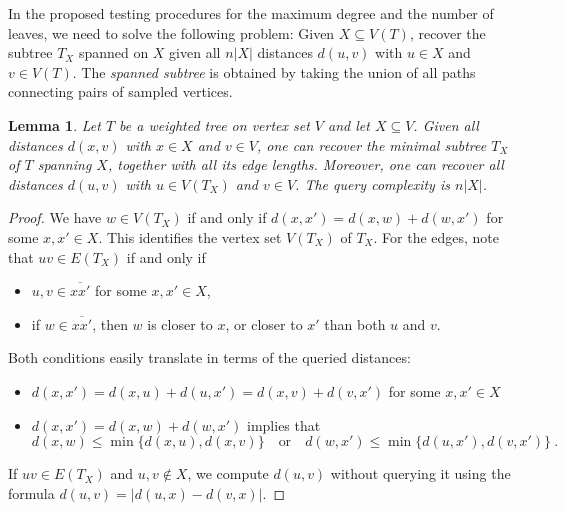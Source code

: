 \documentclass[12pt]{article}
\newtheorem{lemma}[theorem]{Lemma}
\begin{document}
In the proposed testing procedures for the maximum degree and the number of leaves, we need to solve the following problem: Given $X\subseteq V(T)$, recover the subtree $T_X$ spanned on $X$ given all $n|X|$ distances $d(u,v)$ with $u\in X$ and $v\in V(T)$. The \emph{spanned subtree} is obtained by taking the union of all
paths connecting pairs of sampled vertices.
\begin{lemma}\label{lem:TX}
Let $T$ be a weighted tree on vertex set $V$ and let $X\subseteq V$. Given all distances $d(x,v)$ with $x\in X$ and $v\in V$, one can recover the minimal subtree $T_X$ of $T$ spanning $X$, together with all its edge lengths. Moreover, one can recover all distances $d(u,v)$ with $u\in V(T_X)$ and $v\in V$. The query complexity is $n|X|$.
\end{lemma}
 \begin{proof}
     We have $w\in V(T_X)$ if and only if $d(x,x')=d(x,w)+d(w,x')$ for some $x,x'\in X$. This identifies the vertex set $V(T_X)$ of $T_X$. For the edges, note that $uv\in E(T_X)$ if and only if 
     \begin{itemize}
         \item [(i)] $u,v\in \overline{xx'}$ for some $x,x'\in X$,
         \item [(ii)] if $w\in \overline{xx'}$, then $w$ is closer to $x$, or closer to $x'$ than both $u$ and $v$.
     \end{itemize}
     Both conditions easily translate in terms of the queried distances:
     \begin{itemize}
         \item [(i)] $d(x,x')=d(x,u)+d(u,x')=d(x,v)+d(v,x')$ for some $x,x'\in X$
         \item [(ii)] $d(x,x')=d(x,w)+d(w,x')$ implies that 
         $$d(x,w)\leq \min\{d(x,u),d(x,v)\} \quad \text{or} \quad d(w,x')\leq \min\{d(u,x'),d(v,x')\}~.$$
     \end{itemize}
     If $uv\in E(T_X)$ and $u,v\notin X$, we compute $d(u,v)$ without querying it using the formula $d(u,v)=|d(u,x)-d(v,x)|$. 


\end{proof}
\end{document}
